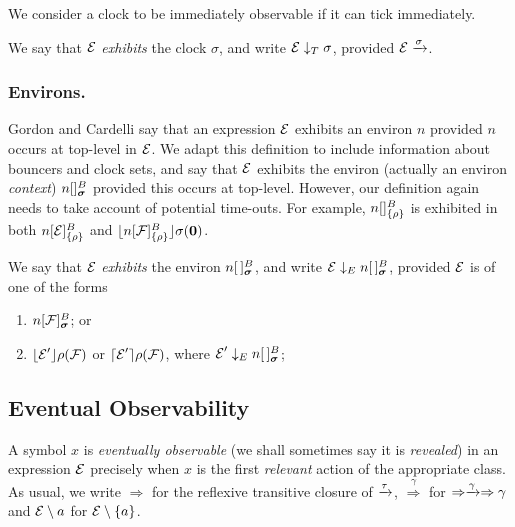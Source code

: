 \documentclass[orivec,envcountsame]{llncs}
\newcommand{\Exhibits}[1]{\mathrel{\downarrow_{#1}}}
\newcommand{\ExhibitsT}{\Exhibits{T}}
\newcommand{\ExhibitsE}{\Exhibits{E}}
\newcommand{\Does}[1]{\xderives{#1}}
\newcommand{\DoesTaus}{\mathrel{\Rightarrow}}
\newcommand{\Weak}[1]{\stackrel{#1}{\Rightarrow}}
\begin{document}
We consider a clock to be immediately observable if it can tick
immediately.

\begin{definition}
We say that $\text{$\mathcal{E}$}$ \emph{exhibits} the clock $\sigma$, and write $\expr
\ExhibitsT \sigma$, provided $\expr \Does{\sigma}$.
\end{definition}

\subsubsection{Environs.} 

Gordon and Cardelli \cite{GC99} say that an expression $\text{$\mathcal{E}$}$ exhibits an
environ $n$ provided $n$ occurs at top-level in $\text{$\mathcal{E}$}$. We adapt this
definition to include information about bouncers and clock sets, and say that
$\text{$\mathcal{E}$}$ exhibits the environ (actually an environ \emph{context}) $\locv{n}{}{B}{\vec{\sigma}}$
provided this occurs at top-level. However, our definition again needs to
take account of potential time-outs. For example, ${n}[  ]^{B}_{\{\rho\}}$ is
exhibited in both ${n}[ \text{$\mathcal{E}$} ]^{B}_{\{\rho\}}$ and
$\lfloor{{n}[ \text{$\mathcal{F}$}]^{B}_{\{\rho\}}}\rfloor {\sigma} ({\textbf{0}})$.

\begin{definition}
We say that $\text{$\mathcal{E}$}$ \emph{exhibits} the environ $\locv{n}{\,}{B}{\vec{\sigma}}$,
and write $\expr \ExhibitsE \locv{n}{\,}{B}{\vec{\sigma}}$, provided $\text{$\mathcal{E}$}$ is 
of one of the forms

\begin{enumerate}
\item
    $\locv{n}{\exprb}{B}{\vec{\sigma}}$; or
\item
    $\lfloor{\text{$\mathcal{E}$}' }\rfloor {\rho} ({\text{$\mathcal{F}$}})$ or $\lceil{\text{$\mathcal{E}$}' }\rceil {\rho} ({\text{$\mathcal{F}$}})$,
    where $\expr' \ExhibitsE \locv{n}{\,}{B}{\vec{\sigma}}$;
\end{enumerate}
\end{definition}


\subsection{Eventual Observability}
\label{sec:eventual-observability}

A symbol $x$ is \emph{eventually observable} (we shall sometimes say it
is \emph{revealed}) in an expression $\text{$\mathcal{E}$}$ precisely when $x$ is the
first \emph{relevant} action of the appropriate class. As usual, we
write $\DoesTaus$ for the reflexive transitive closure of $\Does{\tau}$, 
$\Weak{\gamma}$ for $\DoesTaus\Does{\gamma}\DoesTaus{\gamma}$ and
$\text{$\mathcal{E}$}\setminus {a}$ for $\text{$\mathcal{E}$}\setminus {\{a\}}$.
\end{document}
